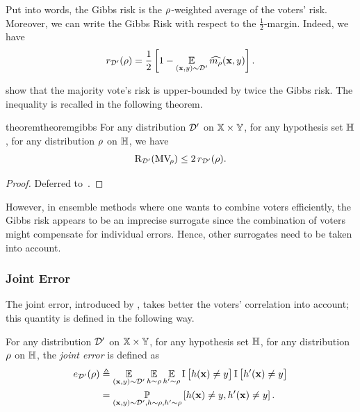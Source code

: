 Put into words, the Gibbs risk is the $\rho$-weighted average of the voters' risk.
Moreover, we can write the Gibbs Risk with respect to the $\frac{1}{2}$-margin. Indeed, we have 
\begin{align}
    r_{\mathcal{D}'}(\rho) = \frac{1}{2}\left[ 1-\operatorname*{\mathbb{E}}_{(\mathbf{x},y)\sim\mathcal{D}'}\widehat{m_{\rho}}(\mathbf{x},y)\right].\label{chap:pac-bayes:eq:gibbs-margin}
\end{align}

\citet{LangfordShaweTaylor2002} show that the majority vote's risk is upper-bounded by twice the Gibbs risk.
The inequality is recalled in the following theorem. 

\begin{restatable}{theorem}{theoremgibbs}\label{chap:pac-bayes:theorem:2gibbs} 
For any distribution $\mathcal{D}'$ on $\mathbb{X}\times\mathbb{Y}$, for any hypothesis set $\mathbb{H}$, for any distribution $\rho$ on $\mathbb{H}$, we have
\begin{align}
\text{R}_{\mathcal{D}'}(\text{MV}_{\!\rho}) \leq 2\, r_{\mathcal{D}'}(\rho).
\label{chap:pac-bayes:eq:2gibbs}
\end{align}
\end{restatable}
\begin{noaddcontents}\begin{proof}
Deferred to~.
\end{proof}\end{noaddcontents}

However, in ensemble methods where one wants to combine voters efficiently, the Gibbs risk appears to be an imprecise surrogate since the combination of voters might compensate for individual errors.
Hence, other surrogates need to be taken into account.

\subsubsection{Joint Error}

The joint error, introduced by \citet{LacasseLavioletteMarchandGermainUsunier2006}, takes better the voters' correlation into account; this quantity is defined in the following way.

\begin{definition}\label{chap:pac-bayes:def:joint} For any distribution $\mathcal{D}'$ on $\mathbb{X}\times\mathbb{Y}$, for any hypothesis set $\mathbb{H}$, for any distribution $\rho$ on $\mathbb{H}$, the {\it joint error} is defined as
\begin{align*}
    e_{\mathcal{D}'}(\rho) &\triangleq \operatorname*{\mathbb{E}}_{(\mathbf{x},y)\sim\mathcal{D}'} \operatorname*{\mathbb{E}}_{h\sim\rho}\operatorname*{\mathbb{E}}_{h'\sim\rho}
     \operatorname{I}\left[h(\mathbf{x}) \ne y\big]\operatorname{I}\big[h'(\mathbf{x}) \ne y\right]\\
    &= \operatorname*{\mathbb{P}}_{(\mathbf{x},y)\sim\mathcal{D}', h\sim\rho, h'\sim\rho}\left[h(\mathbf{x}) \ne y, h'(\mathbf{x}) \ne y\right].
\end{align*}
\end{definition}


